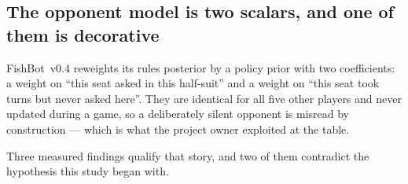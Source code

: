 \documentclass[11pt]{article}
\theoremstyle{definition}
\DeclareRobustCommand{\vfour}{\texorpdfstring{\mbox{FishBot v0.4}}{FishBot v0.4}}
\begin{document}
\subsection{The opponent model is two scalars, and one of them is decorative}
\label{sec:diag-prior}

\vfour{} reweights its rules posterior by a policy prior with two coefficients:
a weight on ``this seat asked in this half-suit'' and a weight on ``this seat took
turns but never asked here''. They are identical for all five other players and
never updated during a game, so a deliberately silent opponent is misread by
construction --- which is what the project owner exploited at the table.

Three measured findings qualify that story, and two of them contradict the
hypothesis this study began with.
\end{document}
